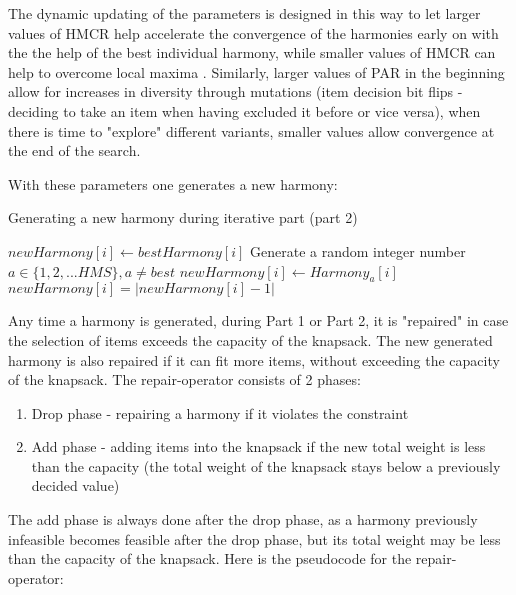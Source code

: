 \documentclass[titlepage]{article}
\begin{document}
The dynamic updating of the parameters is designed in this way to let larger values of HMCR help accelerate the convergence of the harmonies early on with the the help of the best individual harmony, while smaller values of HMCR can help to overcome local maxima \cite{DGHS-article}. Similarly, larger values of PAR in the beginning allow for increases in diversity through mutations (item decision bit flips - deciding to take an item when having excluded it before or vice versa), when there is time to "explore" different variants, smaller values allow convergence at the end of the search. 

With these parameters one generates a new harmony:

\begin{breakablealgorithm}
\caption{Generating a new harmony during iterative part (part 2)}\label{harmonyGen}
    \begin{algorithmic}[1]
                \State $newHarmony[i] \gets bestHarmony[i]$ 
            \Else
                \State Generate a random integer number $a \in \{1, 2, ... HMS\}, a \neq best$
                \State $newHarmony[i] \gets Harmony_{a}[i]$ 
                    \State $newHarmony[i] = |newHarmony[i]-1|$ \Comment{\textcolor{blue}{Flipping i'th item - mutation}}
                \EndIf
            \EndIf
        \EndFor
    \end{algorithmic}
\end{breakablealgorithm}
\vskip 0.5cm


Any time a harmony is generated, during Part 1 or Part 2, it is "repaired" in case the selection of items exceeds the capacity of the knapsack. The new generated harmony is also repaired if it can fit more items, without exceeding the capacity of the knapsack. The repair-operator consists of 2 phases:
\begin{enumerate}
    \item Drop phase - repairing a harmony if it violates the constraint
    \item Add phase - adding items into the knapsack if the new total weight is less than the capacity (the total weight of the knapsack stays below a previously decided value)
\end{enumerate}

The add phase is always done after the drop phase, as a harmony previously infeasible becomes feasible after the drop phase, but its total weight may be less than the capacity of the knapsack. Here is the pseudocode for the repair-operator:
\end{document}
